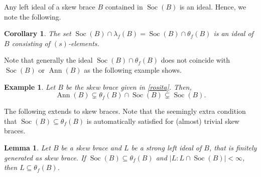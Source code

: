 \documentclass{amsart}
\newcommand{\Ann}{\operatorname{Ann}}
\newcommand{\Soc}{\operatorname{Soc}}
\newtheorem{lem}[thm]{Lemma}
\newtheorem{cor}[thm]{Corollary}
\newtheorem{exa}[thm]{Example}
\begin{document}
Any left ideal of a skew brace $B$ contained in $\Soc(B)$ is an ideal. Hence, we note the following.

\begin{cor}
    The set $\Soc(B)\cap \lambda_f(B)=\Soc(B)\cap \theta_f(B)$ is an ideal of $B$ consisting of $(s)$-elements.
\end{cor}

Note that generally the ideal $\Soc(B) \cap \theta_f(B)$ does not coincide with $\Soc(B)$ or $\Ann(B)$ as the following example shows.
\begin{exa}
    Let $B$ be the skew brace given in \cref{rosita}. Then,  $$\Ann(B)\subsetneq \theta_f(B)\cap  \Soc(B)\subsetneq  \Soc(B).$$
\end{exa}

The following extends \cite[Lemma 4]{FC} to skew braces. Note that the seemingly extra condition that $\Soc(B)\subseteq \theta_f(B)$ is automatically satisfied for (almost) trivial skew braces.
\begin{lem}\label{lemma4}
    Let $B$ be a skew brace and $L$ be a strong left ideal of $B$, that is finitely generated as skew brace. If $\Soc(B) \subseteq \theta_f(B)$ and $|L: L\cap \Soc(B)|<\infty$, then $L \subseteq\theta_f(B)$.
\end{lem}
\end{document}
